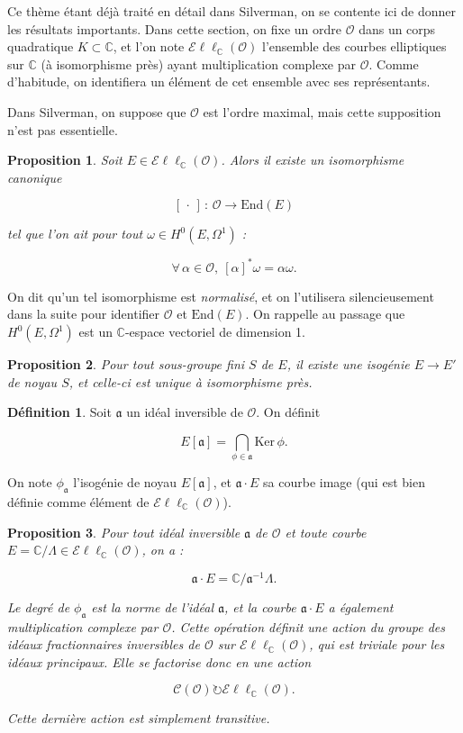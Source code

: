 \documentclass[11pt,a4paper]{article}
\newcommand{\C}{\mathbb{C}}
\renewcommand{\O}{\mathcal{O}}
\newcommand{\Cl}{\mathcal{C}}
\newcommand{\vers}{\rightarrow}
\newcommand{\End}{\mathrm{End}}
\newcommand{\Ell}{\mathcal{E}\ell\ell}
\renewcommand{\frak}{\mathfrak}
\newcommand{\de}{\,:\,}
\newtheorem*{prop}{Proposition}
\theoremstyle{definition}
\newtheorem*{defi}{Définition}
\begin{document}
Ce thème étant déjà traité en détail dans Silverman, on se contente ici de donner les résultats importants. Dans cette section, on fixe un ordre $\O$ dans un corps quadratique $K\subset \C$, et l'on note $\Ell_\C(\O)$ l'ensemble des courbes elliptiques sur $\C$ (à isomorphisme près) ayant multiplication complexe par $\O$. Comme d'habitude, on identifiera un élément de cet ensemble avec ses représentants.

Dans Silverman, on suppose que $\O$ est l'ordre maximal, mais cette supposition n'est pas essentielle.

\begin{prop}

Soit $E\in \Ell_\C(\O)$. Alors il existe un isomorphisme canonique

$$[\,\cdot\,]\de \O\vers \End(E)$$

tel que l'on ait pour tout $\omega\in H^0(E,\Omega^1)$ :

$$\forall\,\alpha\in\O,\ [\alpha]^*\omega = \alpha \omega.$$

\end{prop}

On dit qu'un tel isomorphisme est \emph{normalisé}, et on l'utilisera silencieusement dans la suite pour identifier $\O$ et $\End(E)$. On rappelle au passage que $H^0(E,\Omega^1)$ est un $\C$-espace vectoriel de dimension 1.

\begin{prop}
Pour tout sous-groupe fini $S$ de $E$, il existe une isogénie $E\vers E'$ de noyau $S$, et celle-ci est unique à isomorphisme près.
\end{prop}

\begin{defi}
Soit $\frak a$ un idéal inversible de $\O$. On définit

$$E[\frak a]=\bigcap_{\phi\in \frak a} \mathrm{Ker}\,\phi.$$

On note $\phi_{\frak a}$ l'isogénie de noyau $E[\frak a]$, et $\frak a\cdot E$ sa courbe image (qui est bien définie comme élément de $\Ell_\C(\O)$).
\end{defi}

\begin{prop}

Pour tout idéal inversible $\frak a$ de $\O$ et toute courbe $E=\C/\Lambda\in \Ell_\C(\O)$, on a :

$$\frak a\cdot E = \C/\frak a^{-1} \Lambda.$$

Le degré de $\phi_{\frak a}$ est la norme de l'idéal $\frak a$, et la courbe $\frak a\cdot E$ a également multiplication complexe par $\O$. Cette opération définit une action du groupe des idéaux fractionnaires inversibles de $\O$ sur $\Ell_\C(\O)$, qui est triviale pour les idéaux principaux. Elle se factorise donc en une action

$$\Cl(\O) \circlearrowright \Ell_\C(\O).$$

Cette dernière action est simplement transitive.

\end{prop}
\end{document}
